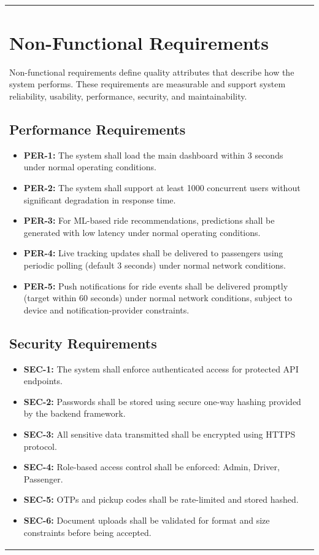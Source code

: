 \begin{longtable}{|>{\raggedright\arraybackslash}p{4cm}|>{\raggedright\arraybackslash}p{11cm}|}
\section{Non-Functional Requirements}

Non-functional requirements define quality attributes that describe how the system performs. These requirements are measurable and support system reliability, usability, performance, security, and maintainability.

\subsection{Performance Requirements}
\begin{itemize}
\item \textbf{PER-1:} The system shall load the main dashboard within 3 seconds under normal operating conditions.
\item \textbf{PER-2:} The system shall support at least 1000 concurrent users without significant degradation in response time.
\item \textbf{PER-3:} For ML-based ride recommendations, predictions shall be generated with low latency under normal operating conditions.
\item \textbf{PER-4:} Live tracking updates shall be delivered to passengers using periodic polling (default 3 seconds) under normal network conditions.
\item \textbf{PER-5:} Push notifications for ride events shall be delivered promptly (target within 60 seconds) under normal network conditions, subject to device and notification-provider constraints.
\end{itemize}

\subsection{Security Requirements}
\begin{itemize}
\item \textbf{SEC-1:} The system shall enforce authenticated access for protected API endpoints.
\item \textbf{SEC-2:} Passwords shall be stored using secure one-way hashing provided by the backend framework.
\item \textbf{SEC-3:} All sensitive data transmitted shall be encrypted using HTTPS protocol.
\item \textbf{SEC-4:} Role-based access control shall be enforced: Admin, Driver, Passenger.
\item \textbf{SEC-5:} OTPs and pickup codes shall be rate-limited and stored hashed.
\item \textbf{SEC-6:} Document uploads shall be validated for format and size constraints before being accepted.
\end{itemize}


\end{longtable}
